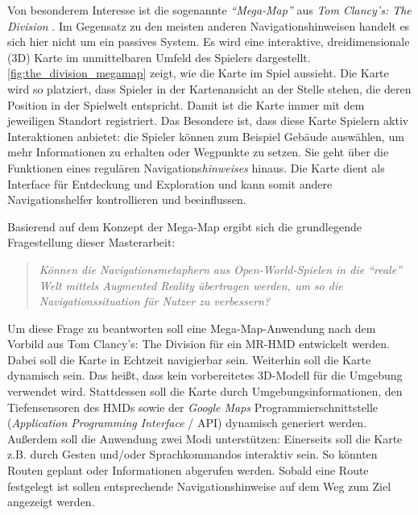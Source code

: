 \documentclass[a4paper]{scrartcl}
\begin{document}
Von besonderem Interesse ist die sogenannte \emph{\enquote{Mega-Map}} aus \emph{Tom Clancy's: The Division} \autocite{Ubisoft2018}.
Im Gegensatz zu den meisten anderen Navigationshinweisen handelt es sich hier nicht um ein passives System.
Es wird eine interaktive, dreidimensionale (3D) Karte im unmittelbaren Umfeld des Spielers dargestellt.
\autoref{fig:the_division_megamap} zeigt, wie die Karte im Spiel aussieht.
Die Karte wird so platziert, dass Spieler in der Kartenansicht an der Stelle stehen, die deren Position in der Spielwelt entspricht.
Damit ist die Karte immer mit dem jeweiligen Standort registriert.
Das Besondere ist, dass diese Karte Spielern aktiv Interaktionen anbietet:
die Spieler können zum Beispiel Gebäude auswählen, um mehr Informationen zu erhalten oder Wegpunkte zu setzen.
Sie geht über die Funktionen eines regulären Navigations\emph{hinweises} hinaus.
Die Karte dient als Interface für Entdeckung und Exploration und kann somit andere Navigationshelfer kontrollieren und beeinflussen.

Basierend auf dem Konzept der Mega-Map ergibt sich die grundlegende Fragestellung dieser Masterarbeit:
\begin{quote}
	\itshape
	Können die Navigationsmetaphern aus Open-World-Spielen in die \enquote{reale} Welt mittels Augmented Reality übertragen werden, um so die Navigationssituation für Nutzer zu verbessern?
\end{quote}

Um diese Frage zu beantworten soll eine Mega-Map-Anwendung nach dem Vorbild aus Tom Clancy's: The Division für ein MR-HMD entwickelt werden.
Dabei soll die Karte in Echtzeit navigierbar sein.
Weiterhin soll die Karte dynamisch sein.
Das heißt, dass kein vorbereitetes 3D-Modell für die Umgebung verwendet wird.
Stattdessen soll die Karte durch Umgebungsinformationen, den Tiefensensoren des HMDs sowie der \emph{Google Maps} Programmierschnittstelle (\emph{Application Programming Interface} / API) dynamisch generiert werden.
Außerdem soll die Anwendung zwei Modi unterstützen: Einerseits soll die Karte z.B. durch Gesten und/oder Sprachkommandos interaktiv sein.
So könnten Routen geplant oder Informationen abgerufen werden.
Sobald eine Route festgelegt ist sollen entsprechende Navigationshinweise auf dem Weg zum Ziel angezeigt werden.
\end{document}
